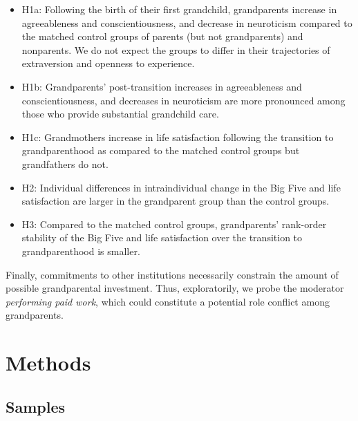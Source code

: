 \documentclass[
  english,
  man, noextraspace,floatsintext]{apa7}
\providecommand{\tightlist}{%
  \setlength{\itemsep}{0pt}\setlength{\parskip}{0pt}}
\begin{document}
\begin{itemize}
\tightlist
\item
  H1a: Following the birth of their first grandchild, grandparents increase in agreeableness and conscientiousness, and decrease in neuroticism compared to the matched control groups of parents (but not grandparents) and nonparents. We do not expect the groups to differ in their trajectories of extraversion and openness to experience.
\item
  H1b: Grandparents' post-transition increases in agreeableness and conscientiousness, and decreases in neuroticism are more pronounced among those who provide substantial grandchild care.
\item
  H1c: Grandmothers increase in life satisfaction following the transition to grandparenthood as compared to the matched control groups but grandfathers do not.
\item
  H2: Individual differences in intraindividual change in the Big Five and life satisfaction are larger in the grandparent group than the control groups.
\item
  H3: Compared to the matched control groups, grandparents' rank-order stability of the Big Five and life satisfaction over the transition to grandparenthood is smaller.
\end{itemize}

Finally, commitments to other institutions necessarily constrain the amount of possible grandparental investment. Thus, exploratorily, we probe the moderator \emph{performing paid work}, which could constitute a potential role conflict among grandparents.

\hypertarget{methods}{%
\section{Methods}\label{methods}}

\hypertarget{samples}{%
\subsection{Samples}\label{samples}}
\end{document}
